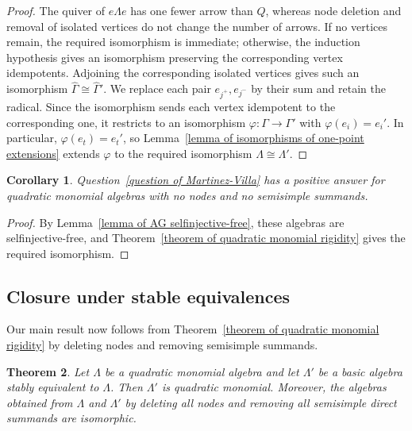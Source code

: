 \documentclass[11pt]{article}
\providecommand{\varLambda}{\Lambda}
\providecommand{\varGamma}{\Gamma}
\newtheorem{theorem}{Theorem}[section]
\newtheorem{corollary}[theorem]{Corollary}
\theoremstyle{definition}
\begin{document}
\begin{proof}
			The quiver of $e\varLambda e$ has one fewer arrow than $Q$, whereas node deletion and removal of isolated vertices do not change the number of arrows.
			If no vertices remain, the required isomorphism is immediate; otherwise, the induction hypothesis gives an isomorphism preserving the corresponding vertex idempotents.
			Adjoining the corresponding isolated vertices gives such an isomorphism $\widehat{\varGamma}\cong \widehat{\varGamma}'$.
			We replace each pair $e_{j^+},e_{j^-}$ by their sum and retain the radical.
			Since the isomorphism sends each vertex idempotent to the corresponding one, it restricts to an isomorphism $\varphi:\varGamma\to\varGamma'$ with $\varphi(e_i)=e_i'$.
			In particular, $\varphi(e_t)=e_t'$, so Lemma~\ref{lemma of isomorphisms of one-point extensions} extends $\varphi$ to the required isomorphism $\varLambda\cong\varLambda'$.
		\end{proof}

		\begin{corollary}\label{corollary of quadratic monomial Martinez-Villa question}
			Question~\ref{question of Martinez-Villa} has a positive answer for quadratic monomial algebras with no nodes and no semisimple summands.
		\end{corollary}
		\begin{proof}
			By Lemma~\ref{lemma of AG selfinjective-free}, these algebras are selfinjective-free, and Theorem~\ref{theorem of quadratic monomial rigidity} gives the required isomorphism.
		\end{proof}

	\subsection{Closure under stable equivalences}\label{sec:induction}
		Our main result now follows from Theorem~\ref{theorem of quadratic monomial rigidity} by deleting nodes and removing semisimple summands.

		\begin{theorem}\label{theorem of quadratic monomial stable closure}
			Let $\varLambda$ be a quadratic monomial algebra and let $\varLambda'$ be a basic algebra stably equivalent to $\varLambda$.
			Then $\varLambda'$ is quadratic monomial.
			Moreover, the algebras obtained from $\varLambda$ and $\varLambda'$ by deleting all nodes and removing all semisimple direct summands are isomorphic.
		\end{theorem}
\end{document}

